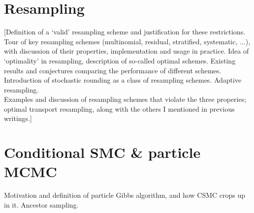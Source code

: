 \section{Resampling} 
[Definition of a `valid' resampling scheme and justification for these restrictions. Tour of key resampling schemes (multinomial, residual, stratified, systematic, ...), with discussion of their properties, implementation and usage in practice. Idea of `optimality' in resampling, description of so-called optimal schemes. Existing results and conjectures comparing the performance of different schemes. Introduction of stochastic rounding as a class of resampling schemes. Adaptive resampling.\\
Examples and discussion of resampling schemes that violate the three properies; optimal transport resampling, along with the others I mentioned in previous writings.]

\section{Conditional SMC \& particle MCMC}
Motivation and definition of particle Gibbs algorithm, and how CSMC crops up in it. Ancestor sampling.